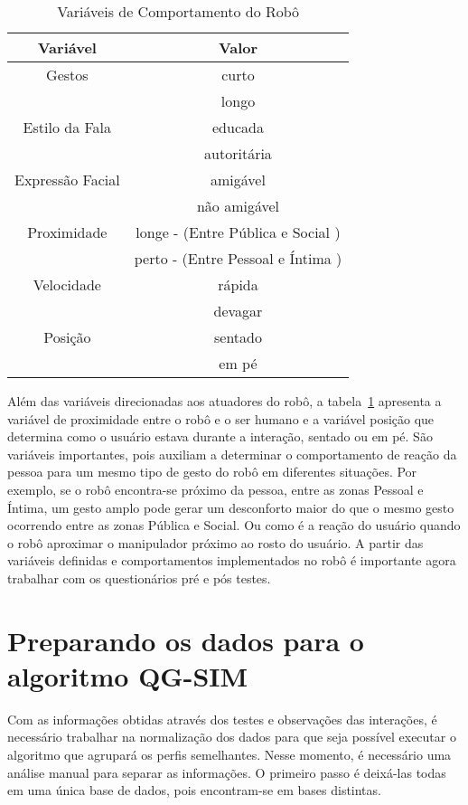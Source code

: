 \begin{table}[!ht]
	\caption{Variáveis de Comportamento do Robô}
	\label{tab:variaveisvalores}
	\centering
	\begin{tabular}{c | c}
		\hline
		Variável & Valor \\
		\hline
		Gestos & curto \\
		& longo \\
		\hline
		Estilo da Fala & educada \\
		& autoritária \\
		\hline
		Expressão Facial & amigável \\
		& não amigável \\
		\hline
		Proximidade & longe - (Entre Pública e Social ) \\
		& perto - (Entre Pessoal e Íntima ) \\
		\hline
		Velocidade & rápida \\
		& devagar \\
		\hline
		Posição & sentado \\
		& em pé \\
		\hline
	\end{tabular}
\end{table}

Além das variáveis direcionadas aos atuadores do robô, a tabela~\ref{tab:variaveisvalores} apresenta a variável de proximidade entre o robô e o ser humano e a variável posição que determina como o usuário estava durante a interação, sentado ou em pé. São variáveis importantes, pois auxiliam a determinar o comportamento de reação da pessoa para um mesmo tipo de gesto do robô em diferentes situações. Por exemplo, se o robô encontra-se próximo da pessoa, entre as zonas Pessoal e Íntima, um gesto amplo pode gerar um desconforto maior do que o mesmo gesto ocorrendo entre as zonas Pública e Social. Ou como é a reação do usuário quando o robô aproximar o manipulador próximo ao rosto do usuário.  A partir das variáveis definidas e comportamentos implementados no robô é importante agora trabalhar com os questionários pré e pós testes.

\section{Preparando os dados para o algoritmo QG-SIM}
\label{sec:preparacao}
Com as informações obtidas através dos testes e observações das interações, é necessário trabalhar na normalização dos dados para que seja possível executar o algoritmo que agrupará os perfis semelhantes. Nesse momento, é necessário uma análise manual para separar as informações. O primeiro passo é deixá-las todas em uma única base de dados, pois encontram-se em bases distintas.

